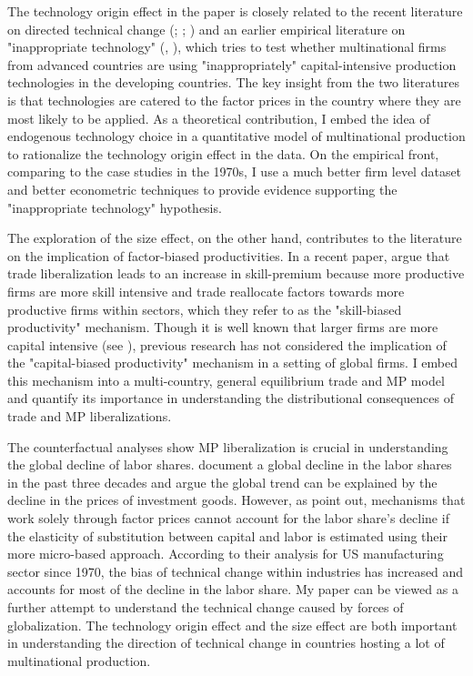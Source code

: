 \documentclass[notitlepage,11pt]{article}%
\begin{document}
The technology origin effect in the paper is closely related to the recent
literature on directed technical change (\cite{acemoglu_patterns_2003};
\cite{acemoglu_labor-_2003}; \cite{acemoglu_offshoring_2012}) and an earlier
empirical literature on "inappropriate technology"
(\cite{mason_observations_1973}, \cite{morley_limited_1977}), which tries to
test whether multinational firms from advanced countries are using
"inappropriately" capital-intensive production technologies in the developing
countries. The key insight from the two literatures is that technologies are
catered to the factor prices in the country where they are most likely to be
applied. As a theoretical contribution, I embed the idea of endogenous
technology choice in a quantitative model of multinational production to
rationalize the technology origin effect in the data. On the empirical front,
comparing to the case studies in the 1970s, I use a much better firm level
dataset and better econometric techniques to provide evidence supporting the
"inappropriate technology" hypothesis.

The exploration of the size effect, on the other hand, contributes to the
literature on the implication of factor-biased productivities. In a recent
paper, \cite{burstein_international_2015} argue that trade liberalization
leads to an increase in skill-premium because more productive firms are more
skill intensive and trade reallocate factors towards more productive firms
within sectors, which they refer to as the "skill-biased productivity"
mechanism. Though it is well known that larger firms are more capital
intensive (see \cite{bernard_firms_2007}), previous research has not
considered the implication of the "capital-biased productivity" mechanism in a
setting of global firms. I embed this mechanism into a multi-country, general
equilibrium trade and MP model and quantify its importance in understanding
the distributional consequences of trade and MP liberalizations.

The counterfactual analyses show MP liberalization is crucial in understanding
the global decline of labor shares. \cite{karabarbounis_global_2014} document
a global decline in the labor shares in the past three decades and argue the
global trend can be explained by the decline in the prices of investment
goods. However, as \cite{oberfield_micro_2014} point out, mechanisms that work
solely through factor prices cannot account for the labor share's decline if
the elasticity of substitution between capital and labor is estimated using
their more micro-based approach. According to their analysis for US
manufacturing sector since 1970, the bias of technical change within
industries has increased and accounts for most of the decline in the labor
share. My paper can be viewed as a further attempt to understand the technical
change caused by forces of globalization. The technology origin effect and the
size effect are both important in understanding the direction of technical
change in countries hosting a lot of multinational production.
\end{document}
